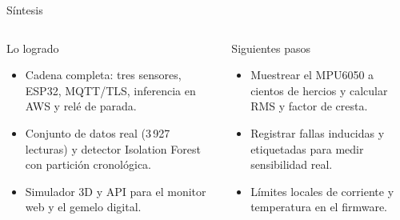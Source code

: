 \documentclass[aspectratio=169]{beamer}
\begin{document}
\begin{frame}{Síntesis}
  \begin{columns}[T]
    \begin{block}{Lo logrado}
      \footnotesize
      \begin{itemize}
        \item Cadena completa: tres sensores, ESP32, MQTT/TLS, inferencia en AWS y relé de
              parada.
        \item Conjunto de datos real (3\,927 lecturas) y detector Isolation Forest con
              partición cronológica.
        \item Simulador 3D y API para el monitor web y el gemelo digital.
      \end{itemize}
    \end{block}
    \begin{alertblock}{Siguientes pasos}
      \footnotesize
      \begin{itemize}
        \item Muestrear el MPU6050 a cientos de hercios y calcular RMS y factor de cresta.
        \item Registrar fallas inducidas y etiquetadas para medir sensibilidad real.
        \item Límites locales de corriente y temperatura en el firmware.
      \end{itemize}
    \end{alertblock}
  \end{columns}
\end{frame}
\end{document}
